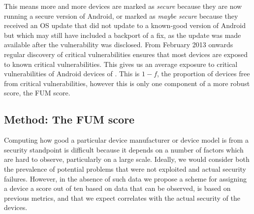 This means more and more devices are marked as \emph{secure} because they are now running a secure version of Android, or marked as \emph{maybe secure} because they received an OS update that did not update to a known-good version of Android but which may still have included a backport of a fix, as the update was made available after the vulnerability was disclosed.
From February 2013 onwards regular discovery of critical vulnerabilities ensures that most devices are exposed to known critical vulnerabilities.
This gives us an average exposure to critical vulnerabilities of Android devices of \daMeanInsecurityPerc.
This is $1 - f$, the proportion of devices free from critical vulnerabilities, however this is only one component of a more robust score, the FUM score.

\subsection{Method: The FUM score}\label{sec:security_scoring:method}

Computing how good a particular device manufacturer or device model is from a security standpoint is difficult because it depends on a number of factors which are hard to observe, particularly on a large scale.
Ideally, we would consider both the prevalence of potential problems that were not exploited and actual security failures.
However, in the absence of such data we propose a scheme for assigning a device a score out of ten based on data that can be observed, is based on previous metrics, and that we expect correlates with the actual security of the devices.

